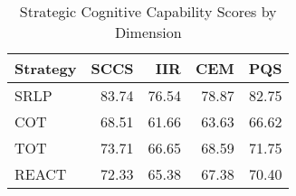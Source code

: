 \begin{table}[htbp]
\centering
\caption{Strategic Cognitive Capability Scores by Dimension}
\label{tab:sccs_by_dimension}
\begin{tabular}{lrrrr}
\toprule
Strategy & SCCS & IIR & CEM & PQS \\
\midrule
SRLP & 83.74 & 76.54 & 78.87 & 82.75 \\
COT & 68.51 & 61.66 & 63.63 & 66.62 \\
TOT & 73.71 & 66.65 & 68.59 & 71.75 \\
REACT & 72.33 & 65.38 & 67.38 & 70.40 \\
\bottomrule
\end{tabular}
\end{table}